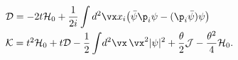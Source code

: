 \begin{equation}
     \begin{array}{ll}
     {\cal D}=-2t{\cal H}_{0}+\displaystyle\frac{1}{2i}\int d^2\vx x_{i}
     \big(\bar{\psi}\p_{i}\psi-(\p_{i}\bar{\psi})\psi\big)
     \\[8pt]
     {\cal K}=
     t^2{\cal H}_{0}+t{\cal D}-
     \displaystyle\frac{1}{2}\int\!d^2\vx\,\vx^2|\psi|^2
     +\frac{\theta}{2}{\cal J}-\frac{\theta^2}{4}{\cal H}_{0}.
     \label{ncconf}
     \end{array}
\end{equation}

